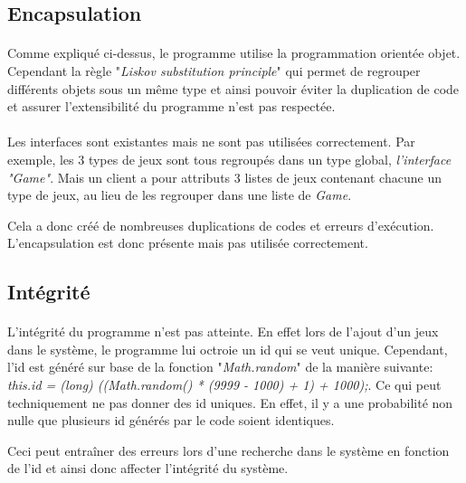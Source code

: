 \subsection{Encapsulation}
    \paragraph{}
        Comme expliqué ci-dessus, le programme utilise la programmation orientée objet. Cependant la règle "\textit{Liskov substitution principle}" qui permet de regrouper différents objets sous un même type et ainsi pouvoir éviter la duplication de code et assurer l'extensibilité du programme n'est pas respectée.
        
    \paragraph{}
        Les interfaces sont existantes mais ne sont pas utilisées correctement. Par exemple, les 3 types de jeux sont tous regroupés dans un type global, \textit{l'interface "Game"}. Mais un client a pour attributs 3 listes de jeux contenant chacune un type de jeux, au lieu de les regrouper dans une liste de \textit{Game}. 
        
        Cela a donc créé de nombreuses duplications de codes et erreurs d'exécution. L'encapsulation est donc présente mais pas utilisée correctement.
        
\vspace{\baselineskip}
\subsection{Intégrité}
    \paragraph{}
        L'intégrité du programme n'est pas atteinte. En effet lors de l'ajout d'un jeux dans le système, le programme lui octroie un id qui se veut unique. Cependant, l'id est généré sur base de la fonction "\textit{Math.random}" de la manière suivante: \textit{this.id =  (long) ((Math.random() * (9999 - 1000) + 1) + 1000);}. Ce qui peut techniquement ne pas donner des id uniques. En effet, il y a une probabilité non nulle que plusieurs id générés par le code soient identiques.
        
        Ceci peut entraîner des erreurs lors d'une recherche dans le système en fonction de l'id et ainsi donc affecter l'intégrité du système.
        
